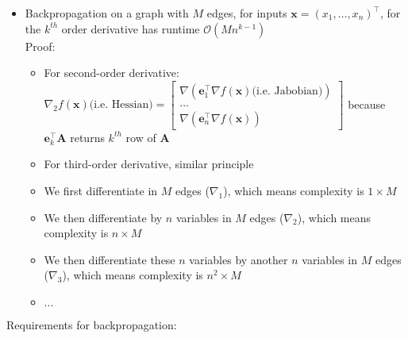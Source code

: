 \begin{itemize}
    \item Backpropagation on a graph with $M$ edges, for inputs $\boldsymbol{x} = (x_1, \dots, x_n)^\intercal$, for the $k^{th}$ order derivative has runtime $\mathcal{O}(Mn^{k-1})$\\
    Proof:
    \begin{itemize}
        \item For second-order derivative: $
        \nabla_2 f(\boldsymbol{x}) \textrm{(i.e. Hessian)} = 
        \begin{bmatrix}
        \nabla( \boldsymbol{e}_1^\intercal \nabla f(\boldsymbol{x}) \textrm{(i.e. Jabobian)})\\
        ...\\
        \nabla( \boldsymbol{e}_n^\intercal \nabla f(\boldsymbol{x}))
        \end{bmatrix}
        $ because $\boldsymbol{e}_k^\intercal \boldsymbol{A}$ returns $k^{th}$ row of $\boldsymbol{A}$
        \item For third-order derivative, similar principle
        \item We first differentiate in $M$ edges ($\nabla_1$), which means complexity is $1 \times M$
        \item We then differentiate by $n$ variables in $M$ edges ($\nabla_2$), which means complexity is $n \times M$
        \item We then differentiate these $n$ variables by another $n$ variables in $M$ edges ($\nabla_3$), which means complexity is $n^2 \times M$
        \item $...$
    \end{itemize}
\end{itemize}
Requirements for backpropagation:
